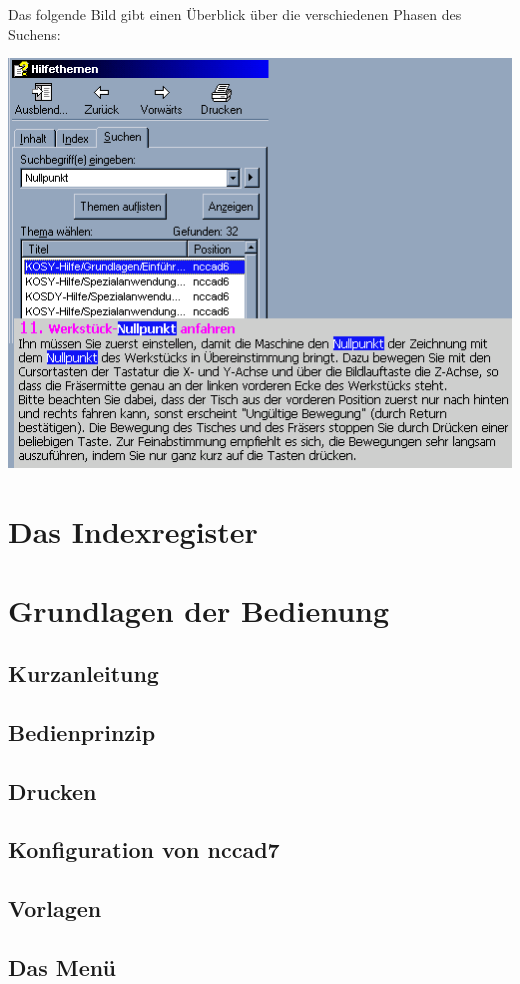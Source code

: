 \documentclass[a4paper]{book}
\begin{document}
\bigskip

Das folgende Bild gibt einen Überblick über die verschiedenen Phasen des Suchens:

\includegraphics{pic/Suche1.png}

\chapter{Das Indexregister} 
\chapter{Grundlagen der Bedienung} 
	\section{Kurzanleitung}
	\section{Bedienprinzip}
	\section{Drucken}
	\section{Konfiguration von nccad7}
	\section{Vorlagen}
	\section{Das Menü}
\end{document}
